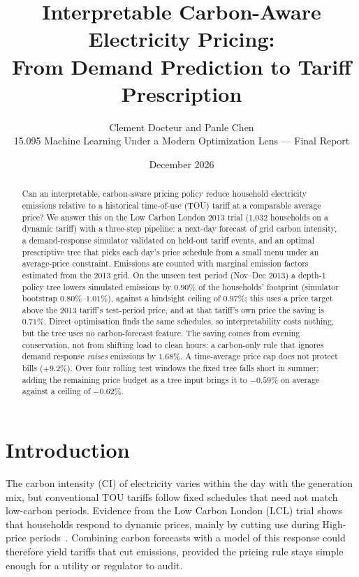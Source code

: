 \documentclass[11pt]{article}
\title{Interpretable Carbon-Aware Electricity Pricing:\\ From Demand Prediction to Tariff Prescription}
\author{Clement Docteur and Panle Chen\\[2pt]
\small 15.095 Machine Learning Under a Modern Optimization Lens --- Final Report}
\date{December 2026}
\newcommand{\pct}[1]{$#1\%$}
\begin{document}
\maketitle

\begin{abstract}
\noindent Can an interpretable, carbon-aware pricing policy reduce household electricity emissions relative to a
historical time-of-use (TOU) tariff at a comparable average price? We answer this on the Low Carbon London 2013 trial
(1,032 households on a dynamic tariff) with a three-step pipeline: a next-day forecast of grid carbon intensity,
a demand-response simulator validated on held-out tariff events, and an optimal prescriptive tree that picks each
day's price schedule from a small menu under an average-price constraint. Emissions are counted with marginal emission
factors estimated from the 2013 grid. On the unseen test period (Nov--Dec 2013) a depth-1 policy tree lowers simulated
emissions by \pct{0.90} of the households' footprint (simulator bootstrap \pct{0.80}--\pct{1.01}), against a
hindsight ceiling of \pct{0.97}; this uses a price target above the 2013 tariff's test-period price, and at that
tariff's own price the saving is \pct{0.71}. Direct optimisation finds the same schedules, so interpretability costs
nothing, but the tree uses no carbon-forecast feature.
The saving comes from evening conservation, not from shifting load to clean hours: a carbon-only rule that ignores
demand response \emph{raises} emissions by \pct{1.68}. A time-average price cap does not protect bills (\pct{+9.2}).
Over four rolling test windows the fixed tree falls short in summer; adding the remaining price budget as a tree input
brings it to \pct{-0.59} on average against a ceiling of \pct{-0.62}.
\end{abstract}

\section{Introduction}

The carbon intensity (CI) of electricity varies within the day with the generation mix, but conventional TOU tariffs
follow fixed schedules that need not match low-carbon periods. Evidence from the Low Carbon London (LCL) trial shows that
households respond to dynamic prices, mainly by cutting use during High-price periods~\cite{schofield2015,schofield2016}.
Combining carbon forecasts with a model of this response could therefore yield tariffs that cut emissions, provided the
pricing rule stays simple enough for a utility or regulator to audit.
\end{document}
